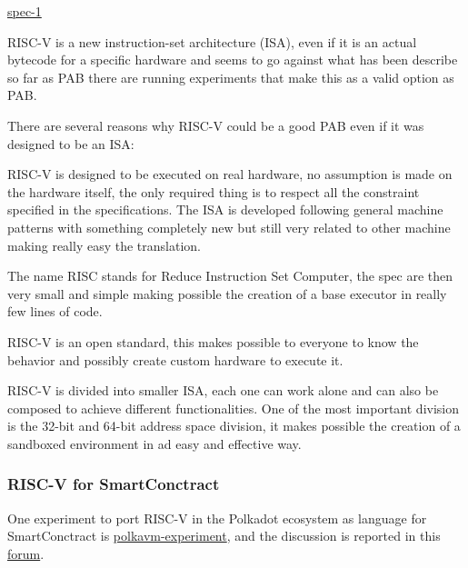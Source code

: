 \documentclass[../main.tex]{subfiles}
\begin{document}
\href{https://github.com/riscv/riscv-isa-manual/releases/download/Ratified-IMAFDQC/riscv-spec-20191213.pdf}{spec-1}

RISC-V is a new instruction-set architecture (ISA), even if it is an actual bytecode for a specific hardware and seems to go against what has been describe so far as PAB there are running experiments that make this as a valid option as PAB.

There are several reasons why RISC-V could be a good PAB even if it was designed to be an ISA:
\begin{description}[style=nextline]
  \item[Real ISA suitable for direct native hardware implementation]
        RISC-V is designed to be executed on real hardware, no assumption is made on the hardware itself, the only required thing is to respect all the constraint specified in the specifications. The ISA is developed following general machine patterns with something completely new but still very related to other machine making really easy the translation.
  \item[RISC]
        The name RISC stands for Reduce Instruction Set Computer, the spec are then very small and simple making possible the creation of a base executor in really few lines of code.
  \item[Completely open ISA]
        RISC-V is an open standard, this makes possible to everyone to know the behavior and possibly create custom hardware to execute it.
  \item[ISA separated into a small base integer ISA]
        RISC-V is divided into smaller ISA, each one can work alone and can also be composed to achieve different functionalities. One of the most important division is the 32-bit and 64-bit address space division, it makes possible the creation of a sandboxed environment in ad easy and effective way.
\end{description}

\subsubsection{RISC-V for SmartConctract}

One experiment to port RISC-V in the Polkadot ecosystem as language for SmartConctract is \href{https://github.com/koute/polkavm-experiment}{polkavm-experiment}, and the discussion is reported in this \href{https://forum.polkadot.network/t/exploring-alternatives-to-wasm-for-smart-contracts/2434}{forum}.
\end{document}

